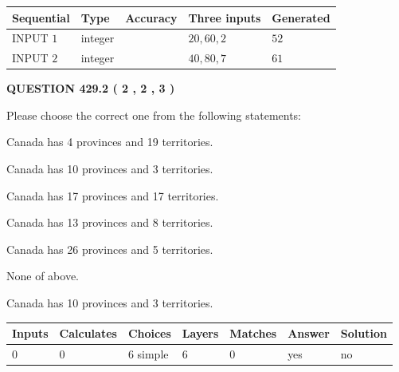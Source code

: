 \documentclass[12pt]{article}
\begin{document}
  
\noindent\begin{tabular}{|l|l|l|l|l|}
\hline
 Sequential & Type & Accuracy & Three inputs & Generated \\ 
\hline
 
 
  INPUT $  1 $ & integer &  & $
 20
 , 
 60
 , 
 2
 $ & $ 52 $ 
 \\  \hline  
 
 
  INPUT $  2 $ & integer &  & $
 40
 , 
 80
 , 
 7
 $ & $ 61 $ 
 \\  \hline  
 \end{tabular}
   
   
  
\vspace{0.2in}
  
{\textbf{\Large{QUESTION
429.2 
 ( 2 , 2 , 3 )
}}}
  
  
Please choose the correct one from the following statements:
 
 
Canada has   4 provinces and  19 territories.
 
 
Canada has 10  provinces and 3 territories.
 
 
Canada has  17 provinces and  17 territories.
 
 
Canada has  13 provinces and  8 territories.
 
 
Canada has  26 provinces and  5 territories.
 
 
 None of above.
 
 
\noindent{}
 
 
Canada has 10  provinces and 3 territories.
 
 
\noindent{}
 
 
   
   
   
   
\noindent\begin{tabular}{|l|l|l|l|l|l|l|}
 \hline
Inputs & Calculates & Choices & Layers & Matches & Answer & Solution \\ \hline
 0  & 
 0  & 
 6
  simple  
  & 
 6  & 
 0  & 
  yes & 
  no 
  \\ \hline
 \end{tabular}
   
\end{document}
